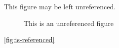 \documentclass{article}
\begin{document}
This figure may be left unreferenced.
\begin{figure}
\caption{This is an unreferenced figure}\label{fig:ok-1}
\end{figure}

\ref{fig:is-referenced}

\end{document}
